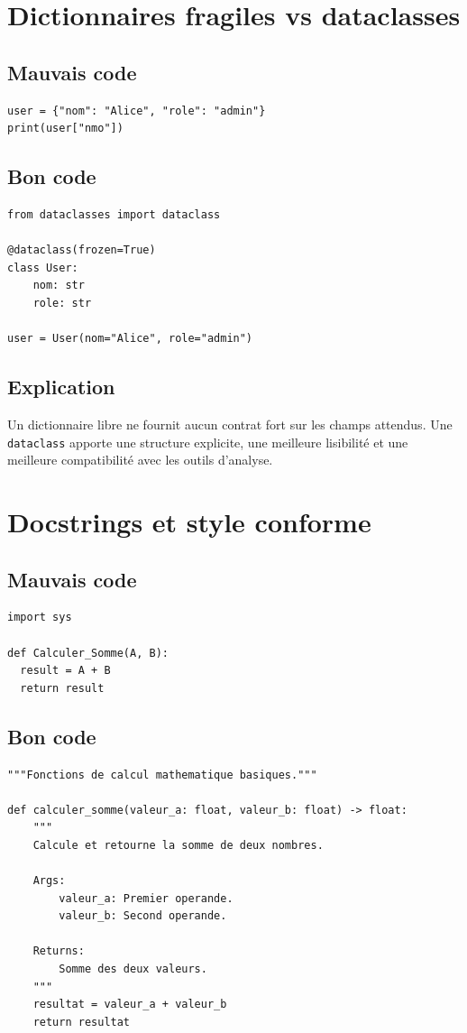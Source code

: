 \documentclass[a4paper,11pt]{report}
\begin{document}
\chapter{Dictionnaires fragiles vs dataclasses}

\section{Mauvais code}
\begin{lstlisting}
user = {"nom": "Alice", "role": "admin"}
print(user["nmo"])
\end{lstlisting}

\section{Bon code}
\begin{lstlisting}
from dataclasses import dataclass

@dataclass(frozen=True)
class User:
    nom: str
    role: str

user = User(nom="Alice", role="admin")
\end{lstlisting}

\section{Explication}
Un dictionnaire libre ne fournit aucun contrat fort sur les champs attendus.
Une \texttt{dataclass} apporte une structure explicite, une meilleure lisibilité et une meilleure compatibilité avec les outils d'analyse.

\chapter{Docstrings et style conforme}

\section{Mauvais code}
\begin{lstlisting}
import sys

def Calculer_Somme(A, B):
  result = A + B
  return result
\end{lstlisting}

\section{Bon code}
\begin{lstlisting}
"""Fonctions de calcul mathematique basiques."""

def calculer_somme(valeur_a: float, valeur_b: float) -> float:
    """
    Calcule et retourne la somme de deux nombres.

    Args:
        valeur_a: Premier operande.
        valeur_b: Second operande.

    Returns:
        Somme des deux valeurs.
    """
    resultat = valeur_a + valeur_b
    return resultat
\end{lstlisting}
\end{document}
